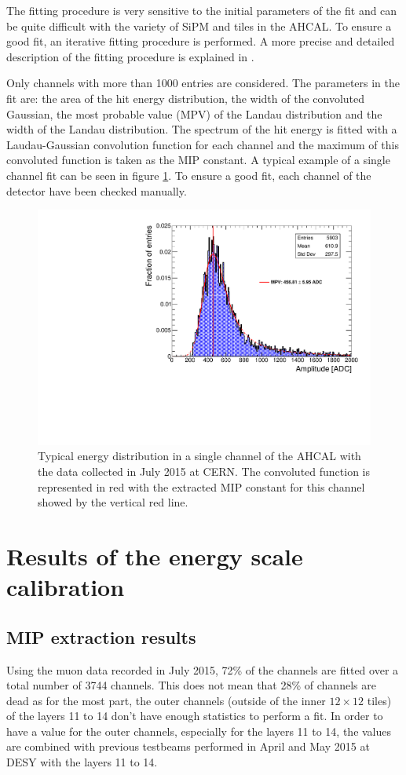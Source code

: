 The fitting procedure is very sensitive to the initial parameters of the fit and can be quite difficult with the variety of SiPM and tiles in the AHCAL. To ensure a good fit, an iterative fitting procedure is performed. A more precise and detailed description of the fitting procedure is explained in \cite{FabianThesis}.

Only channels with more than 1000 entries are considered. The parameters in the fit are: the area of the hit energy distribution, the width of the convoluted Gaussian, the most probable value (MPV) of the Landau distribution and the width of the Landau distribution. The spectrum of the hit energy is fitted with a Laudau-Gaussian convolution function for each channel and the maximum of this convoluted function is taken as the MIP constant. A typical example of a single channel fit can be seen in figure \ref{fig:MIPFit}. To ensure a good fit, each channel of the detector have been checked manually.

\begin{figure}[htbp!]
	\centering
	\includegraphics[width=0.6\linewidth]{../Thesis_Plots/EnergyCalib/Plots/ExampleMIP_Module3.pdf}
	\caption{Typical energy distribution in a single channel of the AHCAL with the data collected in July 2015 at CERN. The convoluted function is represented in red with the extracted MIP constant for this channel showed by the vertical red line.} \label{fig:MIPFit}
\end{figure}

\section{Results of the energy scale calibration}

\subsection{MIP extraction results}

Using the muon data recorded in July 2015, 72\% of the channels are fitted over a total number of 3744 channels. This does not mean that 28\% of channels are dead as for the most part, the outer channels (outside of the inner $12\times12$ tiles) of the layers 11 to 14 don't have enough statistics to perform a fit. In order to have a value for the outer channels, especially for the layers 11 to 14, the values are combined with previous testbeams performed in April and May 2015 at DESY with the layers 11 to 14.

